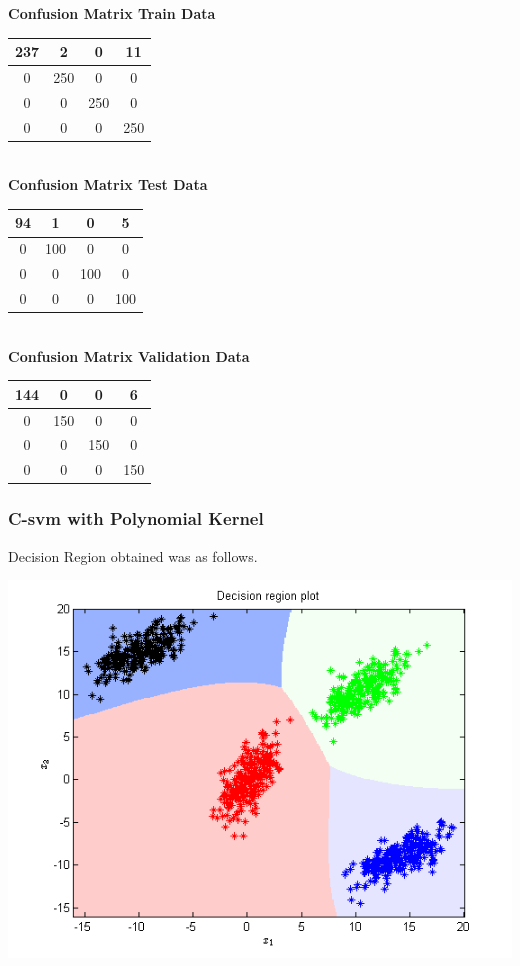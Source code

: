 \documentclass{article}
\begin{document}
\begin{flushleft}
\textbf{Confusion Matrix Train Data\\[5pt]}
\begin{tabular}{|c|c|c|c|}
\hline
237 & 2 & 0 & 11 \\
\hline
0 & 250 & 0 & 0 \\
\hline
0 & 0 & 250 & 0 \\
\hline
0 & 0 & 0 & 250 \\
\hline
\end{tabular}
\textbf{\\[10pt] Confusion Matrix Test Data \\[5pt]}
\begin{tabular}{|c|c|c|c|}
\hline
94 & 1 & 0 & 5 \\
\hline
0 & 100 & 0 & 0 \\
\hline
0 & 0 & 100 & 0 \\
\hline
0 & 0 & 0 & 100 \\
\hline
\end{tabular}
\textbf{\\[10pt] Confusion Matrix Validation Data \\[5pt]}
\begin{tabular}{|c|c|c|c|}
\hline
144 & 0 & 0 & 6 \\
\hline
0 & 150 & 0 & 0 \\
\hline
0 & 0 & 150 & 0 \\
\hline
0 & 0 & 0 & 150 \\
\hline
\end{tabular}
\end{flushleft}




\subsubsection{C-svm with Polynomial Kernel}

Decision Region obtained was as follows.
\begin{center}
\includegraphics[scale=1]{Classification/1a/c_poly/dec}
\end{center}
\end{document}
